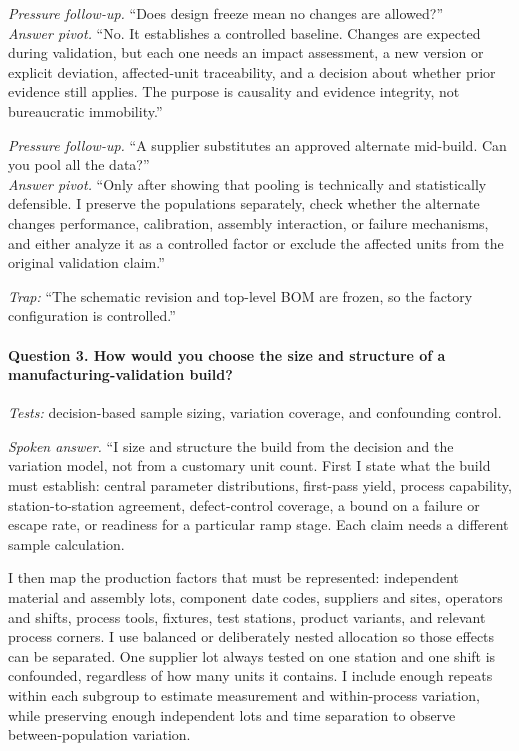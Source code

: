 \textit{Pressure follow-up.} ``Does design freeze mean no changes are
allowed?''\\
\textit{Answer pivot.} ``No. It establishes a controlled baseline. Changes are
expected during validation, but each one needs an impact assessment, a new
version or explicit deviation, affected-unit traceability, and a decision about
whether prior evidence still applies. The purpose is causality and evidence
integrity, not bureaucratic immobility.''

\textit{Pressure follow-up.} ``A supplier substitutes an approved alternate
mid-build. Can you pool all the data?''\\
\textit{Answer pivot.} ``Only after showing that pooling is technically and
statistically defensible. I preserve the populations separately, check whether
the alternate changes performance, calibration, assembly interaction, or
failure mechanisms, and either analyze it as a controlled factor or exclude the
affected units from the original validation claim.''

\textit{Trap:} ``The schematic revision and top-level BOM are frozen, so the
factory configuration is controlled.''

\paragraph{Question 3. How would you choose the size and structure of a
manufacturing-validation build?}
\textit{Tests:} decision-based sample sizing, variation coverage, and
confounding control.

\textit{Spoken answer.}
``I size and structure the build from the decision and the variation model, not
from a customary unit count. First I state what the build must establish:
central parameter distributions, first-pass yield, process capability,
station-to-station agreement, defect-control coverage, a bound on a failure or
escape rate, or readiness for a particular ramp stage. Each claim needs a
different sample calculation.

I then map the production factors that must be represented: independent
material and assembly lots, component date codes, suppliers and sites,
operators and shifts, process tools, fixtures, test stations, product variants,
and relevant process corners. I use balanced or deliberately nested allocation
so those effects can be separated. One supplier lot always tested on one
station and one shift is confounded, regardless of how many units it contains.
I include enough repeats within each subgroup to estimate measurement and
within-process variation, while preserving enough independent lots and time
separation to observe between-population variation.

